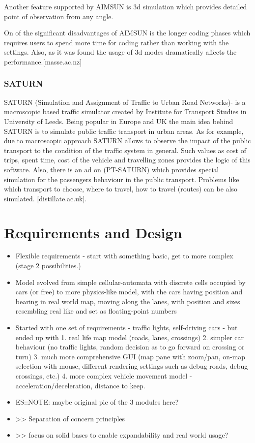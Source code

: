 Another feature  supported by AIMSUN is 3d simulation which provides detailed point of observation from any angle.

On of the significant disadvantages of AIMSUN is the longer coding phases which
requires users to spend more time for coding rather than working with the settings.
Also, as it was found the usage of 3d modes dramatically affects the performance.[masse.ac.nz]

\subsubsection{SATURN}

SATURN (Simulation and Assignment of Traffic to Urban Road Networks)- is a macroscopic based traffic simulator created by
Institute for Transport Studies in University of Leeds. Being popular in Europe and UK the main idea behind SATURN is to simulate public traffic transport in urban areas.
As for example, due to macroscopic approach SATURN allows to observe the impact of the public transport to the condition of the traffic
system in general. Such  values as cost of trips, spent time, cost of the vehicle and travelling zones provides the logic of this software.
Also, there is an ad on  (PT-SATURN) which provides special simulation for the passengers behaviour in the public transport.
Problems like which transport to choose, where to travel, how to travel (routes)
can be also simulated. [distillate.ac.uk].

\section{Requirements and Design}
\begin{itemize}
    \item Flexible requirements - start with something basic, get to more complex (stage 2 possibilities.)
    \item Model evolved from simple cellular-automata with discrete cells occupied by cars (or free) to more physics-like model, with the cars having position and bearing in real world map, moving along the lanes, with position and sizes resembling real like and set as floating-point numbers
    \item Started with one set of requirements - traffic lights, self-driving cars - but ended up with 1. real life map model (roads, lanes, crossings) 2. simpler car behaviour (no traffic lights, random decision as to go forward on crossing or turn) 3. much more comprehensive GUI (map pane with zoom/pan, on-map selection with mouse, different rendering settings such as debug roads, debug crossings, etc.) 4. more complex vehicle movement model - acceleration/deceleration, distance to keep.
	\item ES::NOTE: maybe original pic of the 3 modules here?
	\item >> Separation of concern principles
	\item >> focus on solid bases to enable expandability and real world usage?
\end{itemize}

